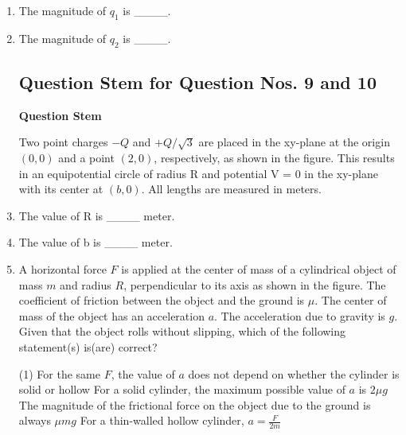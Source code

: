 \documentclass{article}
\begin{document}
\begin{enumerate}

    \item The magnitude of $q_1$ is \_\_\_\_.
    \item The magnitude of $q_2$ is \_\_\_\_.


\subsection*{Question Stem for Question Nos. 9 and 10}

\textbf{Question Stem}

Two point charges $-Q$ and $+Q/\sqrt{3}$ are placed in the xy-plane at the origin $(0, 0)$ and a point $(2, 0)$, respectively, as shown in the figure. This results in an equipotential circle of radius R and potential V = 0 in the xy-plane with its center at $(b, 0)$. All lengths are measured in meters.
\begin{center}
\end{center}


    \item The value of R is \_\_\_\_ meter.
    \item The value of b is \_\_\_\_ meter.

    \item A horizontal force $F$ is applied at the center of mass of a cylindrical object of mass $m$ and radius $R$, perpendicular to its axis as shown in the figure. The coefficient of friction between the object and the ground is $\mu$. The center of mass of the object has an acceleration $a$. The acceleration due to gravity is $g$. Given that the object rolls without slipping, which of the following statement(s) is(are) correct?
        \begin{tasks}(1)
            	\task For the same $F$, the value of $a$ does not depend on whether the cylinder is solid or hollow
            	\task For a solid cylinder, the maximum possible value of $a$ is $2\mu g$
            	\task The magnitude of the frictional force on the object due to the ground is always $\mu mg$
            	\task For a thin-walled hollow cylinder, $a = \frac{F}{2m}$
        \end{tasks}


\end{enumerate}
\end{document}
